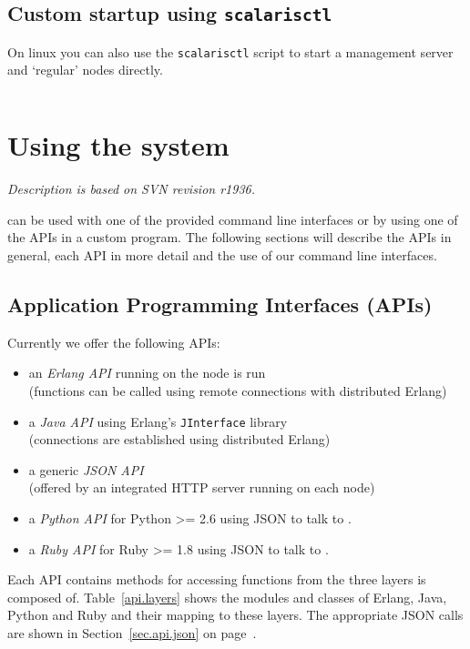 \documentclass[a4paper]{scrreprt}
\newcommand{\sieheref}[1]{\ref{#1} on page~\pageref{#1}}
\newcommand{\code}[1]{\lstinline[basicstyle=\ttfamily]!#1!}
\newcommand{\svnrev}[1]
{\hfill\emph{Description is based on SVN revision #1.}\medskip}
\begin{document}
\section{Custom startup using \code{scalarisctl}}

On linux you can also use the \code{scalarisctl} script to start a
management server and `regular' nodes directly.
\begin{lstlisting}[language=sh]
%> ./bin/scalarisctl -h
\end{lstlisting}


\chapter{Using the system}
\label{chapter.systemuse}
\svnrev{r1936}

\scalaris{} can be used with one of the provided command line interfaces or
by using one of the APIs in a custom program. The following sections will
describe the APIs in general, each API in more detail and the use of our
command line interfaces.

\section{Application Programming Interfaces (APIs)}
\label{chapter.systemuse.apis}

Currently we offer the following APIs:
\begin{itemize}
  \item an \emph{Erlang API} running on the node \scalaris{} is run\\
        (functions can be called using remote connections with distributed
        Erlang)
  \item a \emph{Java API} using Erlang's \code{JInterface} library\\
        (connections are established using distributed Erlang)
  \item a generic \emph{JSON API}\\
        (offered by an integrated HTTP server running on each \scalaris{} node)
  \item a \emph{Python API} for Python >= 2.6 using JSON to talk to \scalaris{}. 
  \item a \emph{Ruby API} for Ruby >= 1.8 using JSON to talk to \scalaris{}. 
\end{itemize}

Each API contains methods for accessing functions from the three layers
\scalaris{} is composed of.
Table~\ref{api.layers} shows the modules and classes of Erlang, Java, Python and Ruby
and their mapping to these layers. The appropriate JSON calls
are shown in Section~\sieheref{sec.api.json}.
\end{document}
